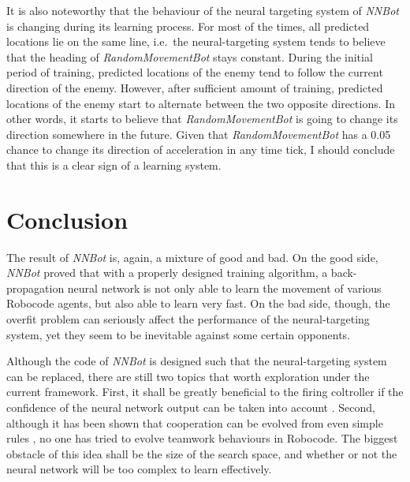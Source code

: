 \documentclass[11pt,a4paper]{article}
\begin{document}
It is also noteworthy that the behaviour of the neural targeting system of \emph{NNBot} is changing during its learning process. For most of the times, all predicted locations lie on the same line, i.e.\ the neural-targeting system tends to believe that the heading of \emph{RandomMovementBot} stays constant. During the initial period of training, predicted locations of the enemy tend to follow the current direction of the enemy. However, after sufficient amount of training, predicted locations of the enemy start to alternate between the two opposite directions. In other words, it starts to believe that \emph{RandomMovementBot} is going to change its direction somewhere in the future. Given that \emph{RandomMovementBot} has a 0.05 chance to change its direction of acceleration in any time tick, I should conclude that this is a clear sign of a learning system.

\section{Conclusion}

The result of \emph{NNBot} is, again, a mixture of good and bad. On the good side, \emph{NNBot} proved that with a properly designed training algorithm, a back-propagation neural network is not only able to learn the movement of various Robocode agents, but also able to learn very fast. On the bad side, though, the overfit problem can seriously affect the performance of the neural-targeting system, yet they seem to be inevitable against some certain opponents.

Although the code of \emph{NNBot} is designed such that the neural-targeting system can be replaced, there are still two topics that worth exploration under the current framework. First, it shall be greatly beneficial to the firing coltroller if the confidence of the neural network output can be taken into account \cite{ann_confidence}. Second, although it has been shown that cooperation can be evolved from even simple rules \cite{cooperation}, no one has tried to evolve teamwork behaviours in Robocode. The biggest obstacle of this idea shall be the size of the search space, and whether or not the neural network will be too complex to learn effectively.



\end{document}
